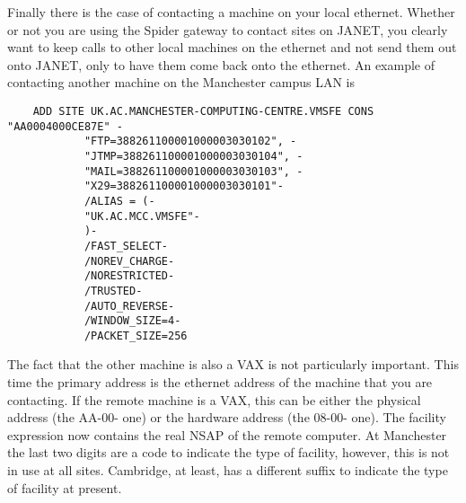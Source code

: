 Finally there is the case of contacting a machine on your local ethernet.
Whether or not you are using the Spider gateway to contact sites on JANET, you
clearly want to keep calls to other local machines on the ethernet and not send
them out onto JANET, only to have them come back onto the ethernet. An example
of contacting another machine on the Manchester campus LAN is

\begin{verbatim}
    ADD SITE UK.AC.MANCHESTER-COMPUTING-CENTRE.VMSFE CONS "AA0004000CE87E" -
            "FTP=388261100001000003030102", -
            "JTMP=388261100001000003030104", -
            "MAIL=388261100001000003030103", -
            "X29=388261100001000003030101"-
            /ALIAS = (-
            "UK.AC.MCC.VMSFE"-
            )-
            /FAST_SELECT-
            /NOREV_CHARGE-
            /NORESTRICTED-
            /TRUSTED-
            /AUTO_REVERSE-
            /WINDOW_SIZE=4-
            /PACKET_SIZE=256
\end{verbatim}

The fact that the other machine is also a VAX is not particularly important.
This time the primary address is the ethernet address of the machine that you
are contacting. If the remote machine is a VAX, this can be either the physical
address (the AA-00- one) or the hardware address (the 08-00- one). The facility
expression now contains the real NSAP of the remote computer. At Manchester the
last two digits are a code to indicate the type of facility, however, this is
not in use at all sites. Cambridge, at least, has a different suffix to
indicate the type of facility at present.


\appendix
